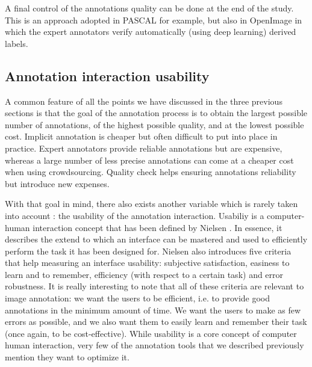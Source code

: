 A final control of the annotations quality can be done at the end of the study. This is an approach adopted in PASCAL \cite{Everingham10} for example, but also in OpenImage \cite{OpenImages} in which the expert annotators verify automatically (using deep learning) derived labels. 


\subsection{Annotation interaction usability}

A common feature of all the points we have discussed in the three previous sections is that the goal of the annotation process is to obtain the largest possible number of annotations, of the highest possible quality, and at the lowest possible cost. Implicit annotation is cheaper but often difficult to put into place in practice. Expert annotators provide reliable annotations but are expensive, whereas a large number of less precise annotations can come at a cheaper cost when using crowdsourcing. Quality check helps ensuring annotations reliability but introduce new expenses. 


With that goal in mind, there also exists another variable which is rarely taken into account : the usability of the annotation interaction. Usabiliy is a computer-human interaction concept that has been defined by Nielsen . In essence, it describes the extend to which an interface can be mastered and used to efficiently perform the task it has been designed for. Nielsen also introduces five criteria that help measuring an interface usability: subjective satisfaction, easiness to learn and to remember, efficiency (with respect to a certain task) and error robustness. It is really interesting to note that all of these criteria are relevant to image annotation: we want the users to be efficient, i.e. to provide good annotations in the minimum amount of time. We want the users to make as few errors as possible, and we also want them to easily learn and remember their task (once again, to be cost-effective). While usability is a core concept of computer human interaction, very few of the annotation tools that we described previously mention they want to optimize it. 



